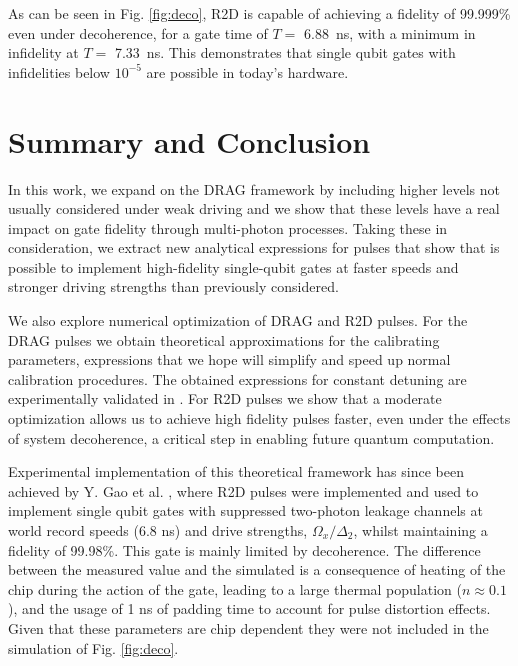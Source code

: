 \documentclass[superscriptaddress,amsmath,amssymb,aps,twocolumn,praplied,notitlepage]{revtex4-2}
\begin{document}
As can be seen in Fig. \ref{fig:deco}, R2D is capable of achieving a fidelity of 99.999\% even under decoherence, for a gate time of $T=$ 6.88~ns, with a minimum in infidelity at $T=$ 7.33~ns. This demonstrates that single qubit gates with infidelities below $10^{-5}$ are possible in today's hardware.




\section{Summary and Conclusion}\label{Conclu}

In this work, we expand on the DRAG framework by including higher levels not usually considered under weak driving and we show that these levels have a real impact on gate fidelity through multi-photon processes. Taking these in consideration, we extract new analytical expressions for pulses that show that is possible to implement high-fidelity single-qubit gates at faster speeds and stronger driving strengths than previously considered.

We also explore numerical optimization of DRAG and R2D pulses. For the DRAG pulses we obtain theoretical approximations for the calibrating parameters, expressions that we hope will simplify and speed up normal calibration procedures. The obtained expressions for constant detuning are experimentally validated in \cite{GAO2025}. For R2D pulses we show that a moderate optimization allows us to achieve high fidelity pulses faster, even under the effects of system decoherence, a critical step in enabling future quantum computation.



Experimental implementation of this theoretical framework has since been achieved by Y. Gao et al.  \cite{GAO2025}, where R2D pulses were implemented and used to implement single qubit gates with suppressed two-photon leakage channels at world record speeds (6.8 ns) and drive strengths, $\Omega_x/\Delta_2$, whilst maintaining a fidelity of 99.98\%. {This gate is mainly limited by decoherence. The difference between the measured value and the simulated is a consequence of heating of the chip during the action of the gate, leading to a large thermal population ($n\approx0.1$), and the usage of 1 ns of padding time to account for pulse distortion effects. Given that these parameters are chip dependent they were not included in the simulation of Fig. \ref{fig:deco}}. 
\end{document}
